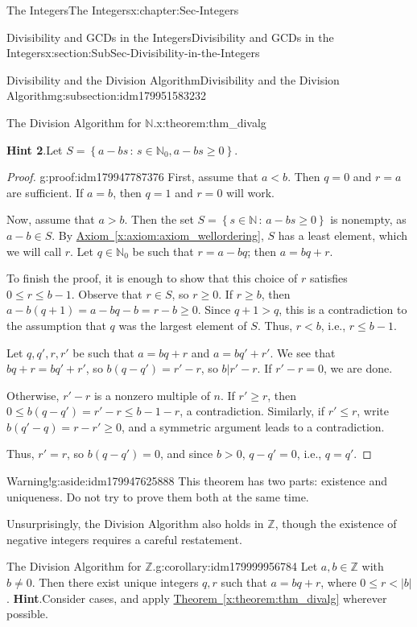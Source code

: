 \documentclass[oneside,10pt,]{book}
\newcommand{\blocktitlefont}{\relax}
\newcommand{\xreffont}{\relax}
\numberwithin{equation}{section}
\renewcommand{\le}{\leqslant}
\renewcommand{\ge}{\geqslant}
\newcommand{\setof}[2]{{\left\{#1\,\colon\,#2\right\}}}
\def\Z{{\mathbb Z}}
\def\N{{\mathbb N}}
\newcommand{\lt}{<}
\begin{document}
\begin{chapterptx}{The Integers}{}{The Integers}{}{}{x:chapter:Sec-Integers}
\begin{sectionptx}{Divisibility and GCDs in the Integers}{}{Divisibility and GCDs in the Integers}{}{}{x:section:SubSec-Divisibility-in-the-Integers}
\begin{subsectionptx}{Divisibility and the Division Algorithm}{}{Divisibility and the Division Algorithm}{}{}{g:subsection:idm179951583232}
\begin{theorem}{The Division Algorithm for \(\N\).}{}{x:theorem:thm_divalg}
\par\smallskip%
\noindent\textbf{\blocktitlefont Hint 2}.\quad{}Let \(S = \setof{a-bs}{s\in \N_0, a-bs\ge 0}\).%
\end{theorem}
\begin{proof}{}{g:proof:idm179947787376}
First, assume that \(a \lt b\). Then \(q = 0\) and \(r = a\) are sufficient. If \(a = b\), then \(q = 1\) and \(r = 0\) will work.%
\par
Now, assume that \(a > b\). Then the set \(S = \setof{s\in\N}{a-bs \ge 0}\) is nonempty, as \(a-b\in S\). By \hyperref[x:axiom:axiom_wellordering]{Axiom~{\xreffont\ref{x:axiom:axiom_wellordering}}}, \(S\) has a least element, which we will call \(r\). Let \(q\in \N_0\) be such that \(r = a-bq\); then \(a = bq + r\).%
\par
To finish the proof, it is enough to show that this choice of \(r\) satisfies \(0\le r \le b-1\). Observe that \(r\in S\), so \(r\ge 0\). If \(r \ge b\), then \(a - b(q+1) = a-bq -b = r -b \ge 0\). Since \(q+1 > q\), this is a contradiction to the assumption that \(q\) was the largest element of \(S\). Thus, \(r \lt b\), i.e., \(r \le b-1\).%
\par
Let \(q,q',r,r'\) be such that \(a = bq+r\) and \(a=bq'+r'\). We see that \(bq+r = bq' + r'\), so \(b(q-q') = r'-r\), so \(b|r'-r\). If \(r'-r = 0\), we are done.%
\par
Otherwise, \(r'-r\) is a nonzero multiple of \(n\). If \(r' \ge r\), then \(0\le b(q-q') = r' - r \le b-1 - r\), a contradiction. Similarly, if \(r' \le r\), write \(b(q'-q) = r-r' \ge 0\), and a symmetric argument leads to a contradiction.%
\par
Thus, \(r' = r\), so \(b(q-q') = 0\), and since \(b > 0\), \(q - q'= 0\), i.e., \(q = q'\).%
\end{proof}
\begin{aside}{Warning!}{g:aside:idm179947625888}%
This theorem has two parts: existence and uniqueness. Do not try to prove them both at the same time.%
\end{aside}
Unsurprisingly, the Division Algorithm also holds in \(\Z\), though the existence of negative integers requires a careful restatement. %
\begin{corollary}{The Division Algorithm for \(\Z\).}{}{g:corollary:idm179999956784}%
\index{Division Algorithm (\(\Z\))}%
Let \(a,b\in \Z\) with \(b\ne 0\). Then there exist unique integers \(q,r\) such that \(a = bq + r\), where \(0 \le r \lt |b|\).%
\textbf{\blocktitlefont Hint}.\quad{}Consider cases, and apply \hyperref[x:theorem:thm_divalg]{Theorem~{\xreffont\ref{x:theorem:thm_divalg}}} wherever possible.%

\end{corollary}
\end{subsectionptx}
\end{sectionptx}
\end{chapterptx}
\end{document}
